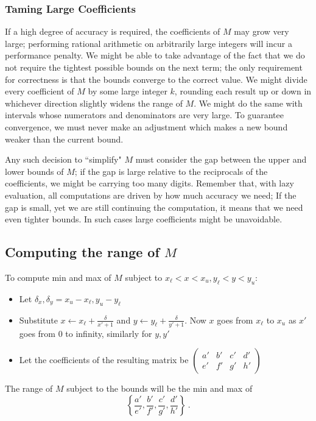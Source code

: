 \documentclass[11pt, oneside]{amsart}   	%
\newcommand{\bihomographic}[8]{\left(\begin{smallmatrix}#1&#2&#3&#4\\#5&#6&#7&#8\end{smallmatrix}\right)}
\begin{document}
\subsubsection{Taming Large Coefficients}
If a high degree of accuracy is required, the coefficients of $M$ may grow very large; performing rational arithmetic on arbitrarily large integers will incur a performance penalty. We might be able to take advantage of the fact that we do not require the tightest possible bounds on the next term; the only requirement for correctness is that the bounds converge to the correct value. We might divide every coefficient of $M$ by some large integer $k$, rounding each result up or down in whichever direction slightly widens the range of $M$. We might do the same with intervals whose numerators and denominators are very large. To guarantee convergence, we must never make an adjustment which makes a new bound weaker than the current bound.

Any such decision to ``simplify" $M$ must consider the gap between the upper and lower bounds of $M$; if the gap is large relative to the reciprocals of the coefficients, we might be carrying too many digits. Remember that, with lazy evaluation, all computations are driven by how much accuracy we need; If the gap is small, yet we are still continuing the computation, it means that we need even tighter bounds. In such cases large coefficients might be unavoidable.


\subsection{Computing the range of $M$}\label{sec:ComputeBounds}
To compute min and max of $M$ subject to $x_{\ell} < x < x_u, y_{\ell} < y < y_u$:
\begin{itemize}
\item Let $\delta_x, \delta_y = x_u - x_{\ell}, y_u - y_{\ell}$
\item Substitute $x \leftarrow x_{\ell} + \frac{\delta}{x'+1}$ and $y \leftarrow y_{\ell} + \frac{\delta}{y'+1}$. Now $x$ goes from $x_{\ell}$ to $x_u$ as $x'$ goes from 0 to infinity, similarly for $y,y'$
\item Let the coefficients of the resulting matrix be $\bihomographic{a'}{b'}{c'}{d'}{e'}{f'}{g'}{h'}$
\end{itemize}
The range of $M$ subject to the bounds will be the min and max of 
\[
\left\{ \frac{a'}{e'},\frac{b'}{f'},\frac{c'}{g'},\frac{d'}{h'} \right\}\ .
\]
\end{document}
